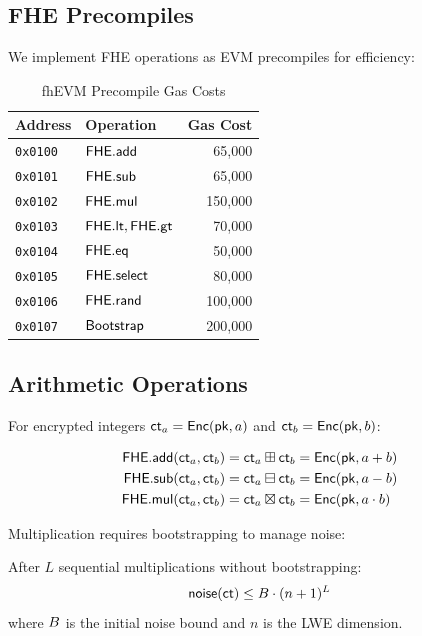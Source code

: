 \documentclass{../shared/luxfhe}
\begin{document}
\subsection{FHE Precompiles}

We implement FHE operations as EVM precompiles for efficiency:

\begin{table}[h]
\centering
\caption{fhEVM Precompile Gas Costs}
\begin{tabular}{llr}
\toprule
Address & Operation & Gas Cost \\
\midrule
\texttt{0x0100} & $\mathsf{FHE.add}$ & 65,000 \\
\texttt{0x0101} & $\mathsf{FHE.sub}$ & 65,000 \\
\texttt{0x0102} & $\mathsf{FHE.mul}$ & 150,000 \\
\texttt{0x0103} & $\mathsf{FHE.lt}, \mathsf{FHE.gt}$ & 70,000 \\
\texttt{0x0104} & $\mathsf{FHE.eq}$ & 50,000 \\
\texttt{0x0105} & $\mathsf{FHE.select}$ & 80,000 \\
\texttt{0x0106} & $\mathsf{FHE.rand}$ & 100,000 \\
\texttt{0x0107} & $\mathsf{Bootstrap}$ & 200,000 \\
\bottomrule
\end{tabular}
\end{table}

\subsection{Arithmetic Operations}

For encrypted integers $\mathsf{ct}_a = \mathsf{Enc}(\mathsf{pk}, a)$ and $\mathsf{ct}_b = \mathsf{Enc}(\mathsf{pk}, b)$:

\begin{align}
\mathsf{FHE.add}(\mathsf{ct}_a, \mathsf{ct}_b) &= \mathsf{ct}_a \boxplus \mathsf{ct}_b = \mathsf{Enc}(\mathsf{pk}, a + b) \\
\mathsf{FHE.sub}(\mathsf{ct}_a, \mathsf{ct}_b) &= \mathsf{ct}_a \boxminus \mathsf{ct}_b = \mathsf{Enc}(\mathsf{pk}, a - b) \\
\mathsf{FHE.mul}(\mathsf{ct}_a, \mathsf{ct}_b) &= \mathsf{ct}_a \boxtimes \mathsf{ct}_b = \mathsf{Enc}(\mathsf{pk}, a \cdot b)
\end{align}

Multiplication requires bootstrapping to manage noise:

\begin{theorem}
After $L$ sequential multiplications without bootstrapping:
\[
\mathsf{noise}(\mathsf{ct}) \leq B \cdot (n+1)^L
\]
where $B$ is the initial noise bound and $n$ is the LWE dimension.
\end{theorem}
\end{document}
